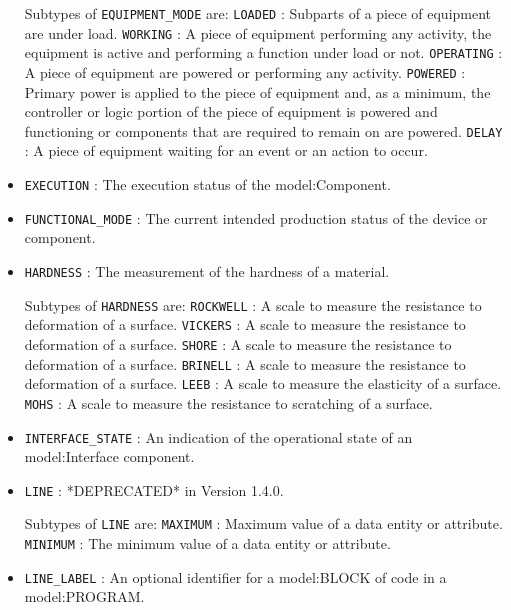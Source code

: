 \begin{itemize}
Subtypes of \texttt{EQUIPMENT_MODE} are: 
\newline\tab \texttt{LOADED} : Subparts of a piece of equipment are under load. 
\newline\tab \texttt{WORKING} : A piece of equipment performing any activity, the equipment is active and performing a function under load or not. 
\newline\tab \texttt{OPERATING} : A piece of equipment are powered or performing any activity. 
\newline\tab \texttt{POWERED} : Primary  power is  applied  to the  piece  of  equipment and,  as  a minimum, the controller or logic portion of the piece of equipment is powered and functioning or components that are required to remain on are powered. 
\newline\tab \texttt{DELAY} : A piece of equipment waiting for an event or an action to occur. 
\item \texttt{EXECUTION} : The execution status of the {model:Component}. 

\item \texttt{FUNCTIONAL_MODE} : The current intended production status of the device or component. 

\item \texttt{HARDNESS} : The measurement of the hardness of a material. 

Subtypes of \texttt{HARDNESS} are: 
\newline\tab \texttt{ROCKWELL} : A scale to measure the resistance to deformation of a surface. 
\newline\tab \texttt{VICKERS} : A scale to measure the resistance to deformation of a surface. 
\newline\tab \texttt{SHORE} : A scale to measure the resistance to deformation of a surface. 
\newline\tab \texttt{BRINELL} : A scale to measure the resistance to deformation of a surface. 
\newline\tab \texttt{LEEB} : A scale to measure the elasticity of a surface. 
\newline\tab \texttt{MOHS} : A scale to measure the resistance to scratching of a surface. 
\item \texttt{INTERFACE_STATE} : An indication of the operational state of an {model:Interface} component. 

\item \texttt{LINE} : *DEPRECATED* in Version 1.4.0. 

Subtypes of \texttt{LINE} are: 
\newline\tab \texttt{MAXIMUM} : Maximum value of a data entity or attribute. 
\newline\tab \texttt{MINIMUM} : The minimum value of a data entity or attribute. 
\item \texttt{LINE_LABEL} : An optional identifier for a {model:BLOCK} of code in a {model:PROGRAM}. 


\end{itemize}
